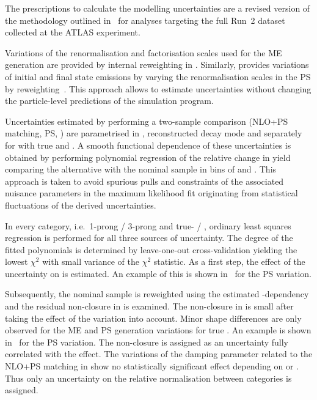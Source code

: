 The prescriptions to calculate the \ttbar modelling uncertainties are
a revised version of the methodology outlined
in~\cite{ATL-PHYS-PUB-2020-023} for analyses targeting the full Run~2
dataset collected at the ATLAS experiment.

Variations of the renormalisation and factorisation scales used for
the ME generation are provided by internal reweighting in
\POWHEGBOX[v2]. Similarly, \PYTHIA[8] provides variations of initial
and final state emissions by varying the renormalisation scales in the
PS by reweighting~\cite{Mrenna:2016sih}. This approach allows to
estimate uncertainties without changing the particle-level predictions
of the simulation program.

Uncertainties estimated by performing a two-sample comparison (NLO+PS
matching, PS, \hdamp) are parametrised in \tauhadvis \pT,
reconstructed \tauhad decay mode and \mTW separately for \ttbar with
true and \faketauhadvis. A smooth functional dependence of these
uncertainties is obtained by performing polynomial regression of the
relative change in yield comparing the alternative with the nominal
sample in bins of \tauhadvis \pT and \mTW. This approach is taken to
avoid spurious pulls and constraints of the associated nuisance
parameters in the maximum likelihood fit originating from statistical
fluctuations of the derived uncertainties.

In every category, i.e.\ 1-prong / 3-prong \tauhadvis and true- /
\faketauhadvis, ordinary least squares regression is performed for all
three sources of uncertainty. The degree of the fitted polynomials is
determined by leave-one-out cross-validation yielding the lowest
$\chi^2$ with small variance of the $\chi^2$ statistic. As a first
step, the effect of the uncertainty on \tauhadvis \pT is estimated. An
example of this is shown
in~
for the PS variation.

Subsequently, the nominal sample is reweighted using the estimated
\pT-dependency and the residual non-closure in \mTW is examined. The
non-closure in \mTW is small after taking the \tauhadvis \pT effect of
the variation into account. Minor shape differences are only observed
for the ME and PS generation variations for true \tauhadvis. An
example is shown
in~
for the PS variation. The non-closure is assigned as an uncertainty
fully correlated with the \pT effect. The variations of the damping
parameter related to the NLO+PS matching in \POWHEG show no
statistically significant effect depending on \tauhadvis \pT or
\mTW. Thus only an uncertainty on the relative normalisation between
categories is assigned.

